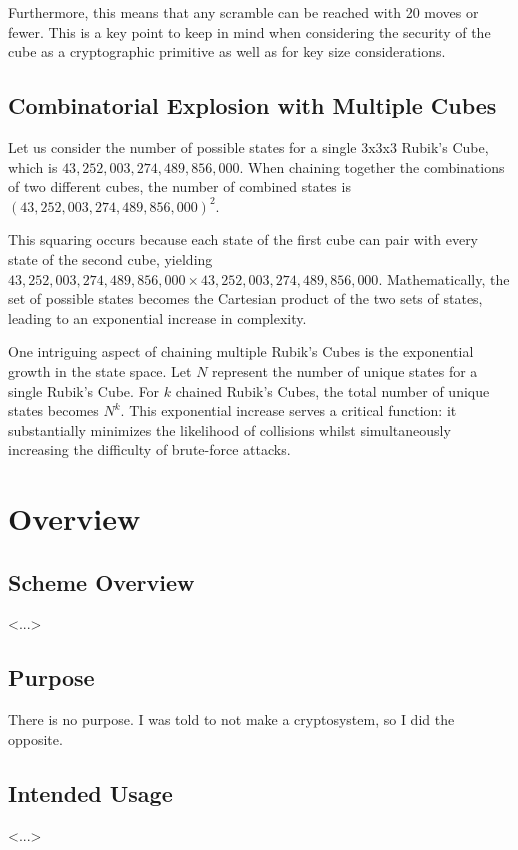 \documentclass[12pt]{article}
\begin{document}
Furthermore, this means that any scramble can be reached with 20 moves or fewer. This is a key point to keep in mind when considering the security of the cube as a cryptographic primitive as well as for key size considerations.\\

\subsection{Combinatorial Explosion with Multiple Cubes}
Let us consider the number of possible states for a single 3x3x3 Rubik's Cube, which is \(43,252,003,274,489,856,000\). When chaining together the combinations of two different cubes, the number of combined states is \((43,252,003,274,489,856,000)^2\).

This squaring occurs because each state of the first cube can pair with every state of the second cube, yielding \(43,252,003,274,489,856,000 \times 43,252,003,274,489,856,000\). Mathematically, the set of possible states becomes the Cartesian product of the two sets of states, leading to an exponential increase in complexity.

One intriguing aspect of chaining multiple Rubik's Cubes is the exponential growth in the state space. Let \( N \) represent the number of unique states for a single Rubik's Cube. For \( k \) chained Rubik's Cubes, the total number of unique states becomes \( N^k \). This exponential increase serves a critical function: it substantially minimizes the likelihood of collisions whilst simultaneously increasing the difficulty of brute-force attacks.

\section{Overview}

\subsection{Scheme Overview}
<...>

\subsection{Purpose}
There is no purpose. I was told to not make a cryptosystem, so I did the opposite.

\subsection{Intended Usage}
<...>
\end{document}
